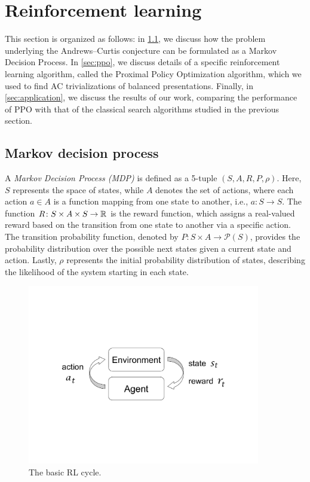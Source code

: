 
\section{Reinforcement learning}\label{sec:rl}


This section is organized as follows: in \cref{sec:mdp}, we discuss how the problem underlying the Andrews--Curtis conjecture can be formulated as a Markov Decision Process.
In \cref{sec:ppo}, we discuss details of a specific reinforcement learning algorithm, called the Proximal Policy Optimization algorithm, which we used to find AC trivializations of balanced presentations.
Finally, in \cref{sec:application}, we discuss the results of our work, comparing the performance of PPO with that of the classical search algorithms studied in the previous section.

\subsection{Markov decision process} \label{sec:mdp}

A \textit{Markov Decision Process (MDP)} is defined as a 5-tuple $(S, A, R, P, \rho)$. Here, $S$ represents the space of states, while $A$ denotes the set of actions, where each action $a \in A$ is a function mapping from one state to another, i.e., $a \colon S \to S$. The function $R \colon S \times A \times S \to \mathbb{R}$ is the reward function, which assigns a real-valued reward based on the transition from one state to another via a specific action. The transition probability function, denoted by $P \colon S \times A \to \mathcal{P}(S)$, provides the probability distribution over the possible next states given a current state and action. Lastly, $\rho$ represents the initial probability distribution of states, describing the likelihood of the system starting in each state.

\begin{figure}[ht]
	\centering
	\includegraphics[trim={0.0in 3.0in 0.0in 2.5in},clip,width=4.0in]{fig/RLbasic.pdf}
	\caption{The basic RL cycle.}
	\label{fig:RLbasic}
\end{figure}

